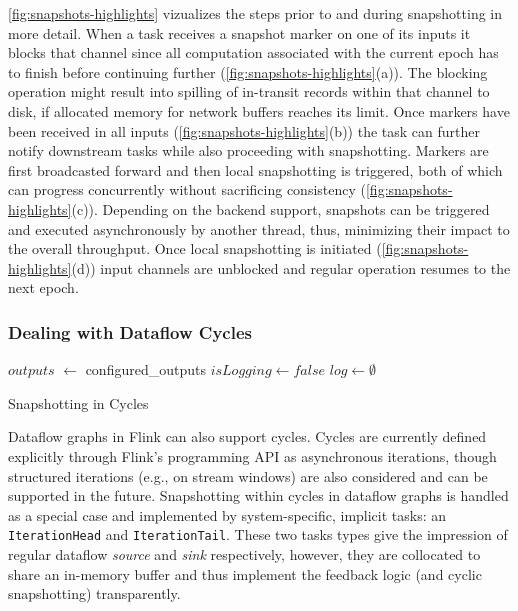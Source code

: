  \autoref{fig:snapshots-highlights} vizualizes the steps prior to and during snapshotting in more detail. When a task receives a snapshot marker on one of its inputs it blocks that channel since all computation associated with the current epoch has to finish before continuing further (\autoref{fig:snapshots-highlights}(a)). The blocking operation might result into spilling of in-transit records within that channel to disk, if allocated memory for network buffers reaches its limit. Once markers have been received in all inputs (\autoref{fig:snapshots-highlights}(b)) the task can further notify downstream tasks while also proceeding with snapshotting. Markers are first broadcasted forward and then local snapshotting is triggered, both of which can progress concurrently without sacrificing consistency (\autoref{fig:snapshots-highlights}(c)). Depending on the backend support, snapshots can be triggered and executed asynchronously by another thread, thus, minimizing their impact to the overall throughput. Once local snapshotting is initiated (\autoref{fig:snapshots-highlights}(d)) input channels are unblocked and regular operation resumes to the next epoch.

\subsubsection{Dealing with Dataflow Cycles}

\begin{algorithm}[t!]
$outputs$ $\leftarrow$ configured\_outputs\;
$isLogging \leftarrow false$ \;
$log \leftarrow \emptyset$ \;

\caption{Snapshotting in Cycles}
\label{alg:snapcycle}
\end{algorithm}


Dataflow graphs in Flink can also support cycles. Cycles are currently defined explicitly through Flink's programming API as asynchronous iterations, though structured iterations (e.g., on stream windows) are also considered and can be supported in the future. Snapshotting within cycles in dataflow graphs is handled as a special case and implemented by system-specific, implicit tasks: an \texttt{IterationHead} and \texttt{IterationTail}. These two tasks types give the impression of regular dataflow \emph{source} and \emph{sink} respectively, however, they are collocated to share an in-memory buffer and thus implement the feedback logic (and cyclic snapshotting) transparently.

